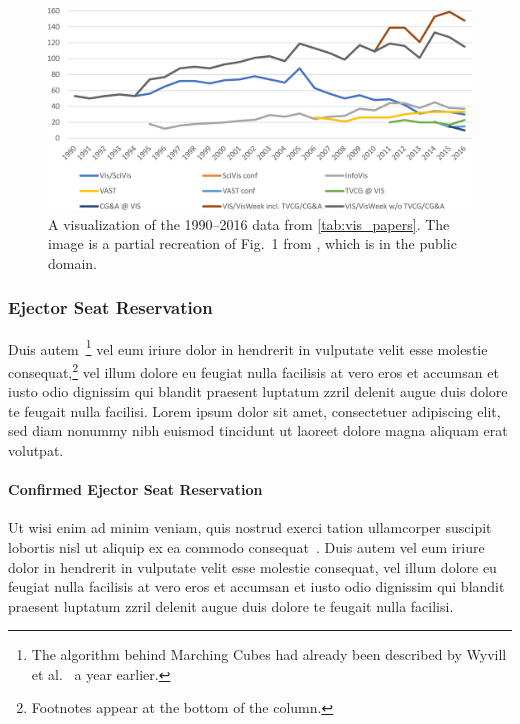 \documentclass[journal]{vgtc}                %
\begin{document}
\begin{figure}[tb]
 \centering %
 \includegraphics[width=\columnwidth]{paper-count-2016}
 \caption{%
	A visualization of the 1990--2016 data from \autoref{tab:vis_papers}.
	The image is a partial recreation of Fig.\ 1 from \cite{Isenberg:2017:VMC}, which is in the public domain.%
	}
 \label{fig:sample}
\end{figure}


\subsubsection{Ejector Seat Reservation}

Duis autem~\cite{Lorensen:1987:MCA}\footnote{The algorithm behind Marching Cubes \cite{Lorensen:1987:MCA} had already been described by Wyvill et al.\ \cite{Wyvill:1986:DSS} a year earlier.} 
vel eum iriure dolor in hendrerit in vulputate velit esse molestie consequat,\footnote{Footnotes appear at the bottom of the column.}
vel illum dolore eu feugiat nulla facilisis at vero eros et accumsan et iusto odio dignissim qui blandit praesent luptatum zzril delenit augue duis dolore te feugait nulla facilisi.
Lorem ipsum dolor sit amet, consectetuer adipiscing elit, sed diam nonummy nibh euismod tincidunt ut laoreet dolore magna aliquam erat volutpat.


\paragraph{Confirmed Ejector Seat Reservation}

Ut wisi enim ad minim veniam, quis nostrud exerci tation ullamcorper
suscipit lobortis nisl ut aliquip ex ea commodo consequat~\cite{Nielson:1991:TAD}.
Duis autem vel eum iriure dolor in hendrerit in vulputate velit esse molestie consequat, vel illum dolore eu feugiat nulla facilisis at vero eros et accumsan et iusto odio dignissim qui blandit praesent luptatum zzril delenit augue duis dolore te feugait nulla facilisi.
\end{document}
